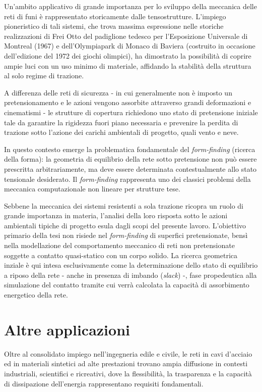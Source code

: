 Un'ambito applicativo di grande importanza per lo sviluppo della meccanica delle reti di funi è rappresentato storicamente dalle tensostrutture. L'impiego pioneristico di tali sistemi, che trova massima espressione nelle storiche realizzazioni di Frei Otto del padiglione tedesco per l'Esposizione Universale di Montreal (1967) e dell'Olympiapark di Monaco di Baviera (costruito in occasione dell'edizione del 1972 dei giochi olimpici), ha dimostrato la possibilità di coprire ampie luci con un uso minimo di materiale, affidando la stabilità della struttura al solo regime di trazione. 

A differenza delle reti di sicurezza - in cui generalmente non è imposto un pretensionamento e le azioni vengono assorbite attraverso grandi deformazioni e cinematismi - le strutture di copertura richiedono uno stato di pretensione iniziale tale da garantire la rigidezza fuori piano necessaria e prevenire la perdita di trazione sotto l'azione dei carichi ambientali di progetto, quali vento e neve.  

In questo contesto emerge la problematica fondamentale del \textit{form-finding} (ricerca della forma): la geometria di equilibrio della rete sotto pretensione non può essere prescritta arbitrariamente, ma deve essere determinata contestualmente allo stato tensionale desiderato. Il \textit{form-finding} rappresenta uno dei classici problemi della meccanica computazionale non lineare per strutture tese. 

Sebbene la meccanica dei sistemi resistenti a sola trazione ricopra un ruolo di grande importanza in materia, l'analisi della loro risposta sotto le azioni ambientali tipiche di progetto esula dagli scopi del presente lavoro. L'obiettivo primario della tesi non risiede nel \textit{form-finding} di superfici pretensionate, bensì nella modellazione del comportamento meccanico di reti non pretensionate soggette a contatto quasi-statico con un corpo solido. La ricerca geometrica inziale è qui intesa esclusivamente come la determinazione dello stato di equilibrio a riposo della rete - anche in presenza di imbando (\textit{slack}) -, fase propedeutica alla simulazione del contatto tramite cui verrà calcolata la capacità di assorbimento energetico della rete.   

\section{Altre applicazioni}
Oltre al consolidato impiego nell'ingegneria edile e civile, le reti in cavi d'acciaio ed in materiali sintetici ad alte prestazioni trovano ampia diffusione in contesti industriali, scientifici e ricreativi, dove la flessibilità, la trasparenza e la capacità di dissipazione dell'energia rappresentano requisiti fondamentali. 

